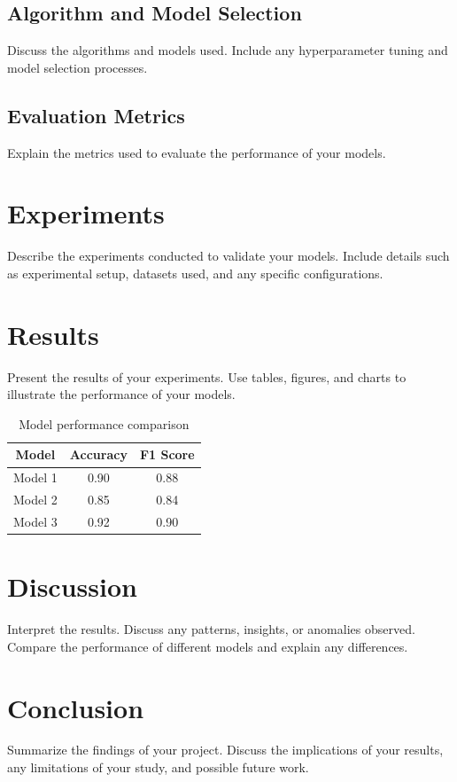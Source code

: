 \documentclass{article}
\begin{document}
\subsection{Algorithm and Model Selection}
Discuss the algorithms and models used. Include any hyperparameter tuning and model selection processes.

\subsection{Evaluation Metrics}
Explain the metrics used to evaluate the performance of your models.

\section{Experiments}
\label{sec:experiments}
Describe the experiments conducted to validate your models. Include details such as experimental setup, datasets used, and any specific configurations.

\section{Results}
\label{sec:results}
Present the results of your experiments. Use tables, figures, and charts to illustrate the performance of your models.

\begin{table}[ht]
    \centering
    \begin{tabular}{|c|c|c|}
        \hline
        Model & Accuracy & F1 Score \\
        \hline
        Model 1 & 0.90 & 0.88 \\
        Model 2 & 0.85 & 0.84 \\
        Model 3 & 0.92 & 0.90 \\
        \hline
    \end{tabular}
    \caption{Model performance comparison}
    \label{tab:results}
\end{table}

\section{Discussion}
\label{sec:discussion}
Interpret the results. Discuss any patterns, insights, or anomalies observed. Compare the performance of different models and explain any differences.

\section{Conclusion}
\label{sec:conclusion}
Summarize the findings of your project. Discuss the implications of your results, any limitations of your study, and possible future work.
\end{document}
